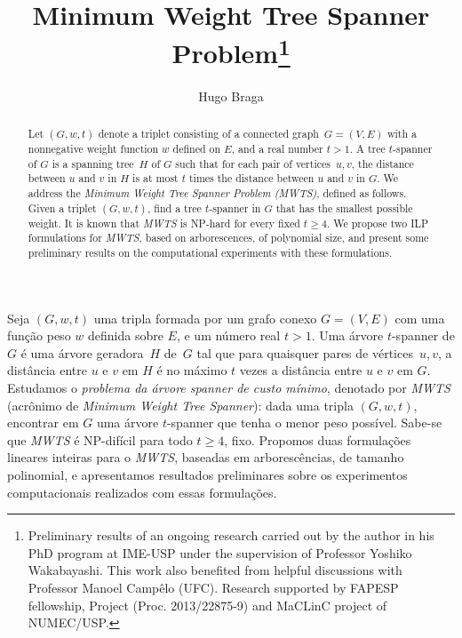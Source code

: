 \documentclass[12pt]{article}
\title{Minimum Weight Tree Spanner
  Problem\protect\footnote{Preliminary results of an ongoing research
    carried out by the author in his PhD program at IME-USP under the
    supervision of Professor Yoshiko Wakabayashi. This work also
    benefited from helpful discussions with Professor Manoel Campêlo
    (UFC).  Research supported by FAPESP fellowship, Project
    (Proc. 2013/22875-9) and MaCLinC project of NUMEC/USP.}}
\author{Hugo Braga}
\begin{document}
 

\maketitle

\begin{abstract}
  Let $(G,w,t)$ denote a triplet consisting of a connected graph~$G=(V,E)$
  with a nonnegative weight function $w$ defined on $E$, and a real
  number $t>1$.
  A tree \hbox{$t$-spanner} of $G$ is a spanning tree~$H$ of $G$
  such that for each pair of vertices~$u$,$\,v$, the distance between
  $u$ and $v$ in $H$ is at most $t$ times the distance between $u$ and
  $v$ in $G$.  
  We address the \emph{Minimum Weight Tree Spanner Problem 
  (MWTS)}, defined as follows. Given a triplet $(G,w,t)$, find a
  tree $t$-spanner in $G$ that has the smallest possible
  weight. It is known that \emph{MWTS} is {\rm NP}-hard for every fixed
  $t\ge 4$.
  We propose two ILP formulations for \emph{MWTS}, based on
  arborescences, of polynomial size, and present some preliminary
  results on the computational experiments with these formulations.
\end{abstract}
     
\begin{resumo}
  Seja $(G,w,t)$ uma tripla formada por um grafo conexo $G=(V,E)$ com
  uma função peso $w$ definida sobre $E$, e um número real $t>1$.  Uma
  árvore $t$-spanner de $G$ é uma árvore geradora~$H$ de~$G$ tal que
  para quaisquer pares de vértices~$u$,$\,v$, a distância entre $u$ e
  $v$ em $H$ é no máximo $t$ vezes a distância entre $u$ e $v$ em $G$.
  Estudamos o \emph{problema da árvore spanner de custo mínimo},
  denotado por \emph{MWTS} (acrônimo de \emph{Minimum Weight Tree
    Spanner}): dada uma tripla $(G,w,t)$, encontrar em $G$ uma
  árvore $t$-spanner que tenha o menor peso possível. Sabe-se que
  \emph{MWTS} é {\rm NP}-difícil para todo $t\ge 4$, fixo.  Propomos duas
  formulações lineares inteiras para o \emph{MWTS}, baseadas em
  arborescências, de tamanho polinomial, e apresentamos resultados
  preliminares sobre os experimentos computacionais realizados com
  essas formulações.

\end{resumo}
\end{document}
